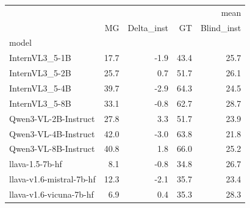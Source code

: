 \begin{tabular}{lrrrr}
\toprule
 & \multicolumn{4}{r}{mean} \\
 & MG & Delta_inst & GT & Blind_inst \\
model &  &  &  &  \\
\midrule
InternVL3_5-1B & 17.7 & -1.9 & 43.4 & 25.7 \\
InternVL3_5-2B & 25.7 & 0.7 & 51.7 & 26.1 \\
InternVL3_5-4B & 39.7 & -2.9 & 64.3 & 24.5 \\
InternVL3_5-8B & 33.1 & -0.8 & 62.7 & 28.7 \\
Qwen3-VL-2B-Instruct & 27.8 & 3.3 & 51.7 & 23.9 \\
Qwen3-VL-4B-Instruct & 42.0 & -3.0 & 63.8 & 21.8 \\
Qwen3-VL-8B-Instruct & 40.8 & 1.8 & 66.0 & 25.2 \\
llava-1.5-7b-hf & 8.1 & -0.8 & 34.8 & 26.7 \\
llava-v1.6-mistral-7b-hf & 12.3 & -2.1 & 35.7 & 23.4 \\
llava-v1.6-vicuna-7b-hf & 6.9 & 0.4 & 35.3 & 28.3 \\
\bottomrule
\end{tabular}
